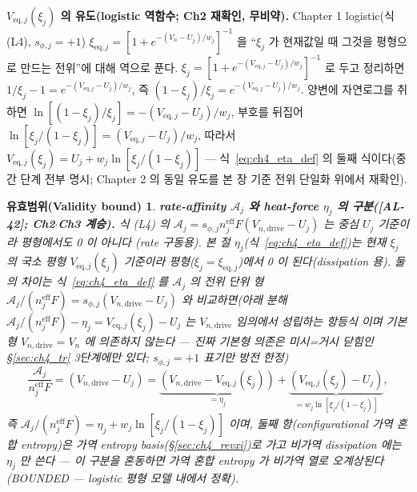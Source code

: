 \documentclass[11pt,a4paper]{article}
\newtheorem*{boundbox}{유효범위(Validity bound)}
\newcommand{\eff}{\mathrm{eff}}
\newcommand{\eq}{\mathrm{eq}}
\newcommand{\drive}{\mathrm{drive}}
\newcommand{\AL}[1]{\textsf{[AL-#1]}}
\begin{document}
\textbf{$V_{\eq,j}(\xi_j)$ 의 유도(logistic 역함수; Ch2 재확인, 무비약).} Chapter 1 logistic(식 (L4),
$s_{\phi,j}=+1$) $\xi_{\eq,j}=[1+e^{-(V_n-U_j)/w_j}]^{-1}$ 을 ``$\xi_j$ 가 현재값일 때 그것을 평형으로 만드는
전위''에 대해 역으로 푼다. $\xi_j=[1+e^{-(V_{\eq,j}-U_j)/w_j}]^{-1}$ 로 두고 정리하면 $1/\xi_j-1=
e^{-(V_{\eq,j}-U_j)/w_j}$, 즉 $(1-\xi_j)/\xi_j=e^{-(V_{\eq,j}-U_j)/w_j}$. 양변에 자연로그를 취하면
$\ln[(1-\xi_j)/\xi_j]=-(V_{\eq,j}-U_j)/w_j$, 부호를 뒤집어 $\ln[\xi_j/(1-\xi_j)]=(V_{\eq,j}-U_j)/w_j$, 따라서
$V_{\eq,j}(\xi_j)=U_j+w_j\ln[\xi_j/(1-\xi_j)]$ — 식~\eqref{eq:ch4_eta_def} 의 둘째 식이다(중간 단계 전부 명시;
Chapter 2 의 동일 유도를 본 장 기준 전위 단일화 위에서 재확인).
\begin{boundbox}
\textbf{rate-affinity $\mathcal A_j$ 와 heat-force $\eta_j$ 의 구분(\AL{42}; Ch2$\cdot$Ch3 계승).} 식 (L4) 의
$\mathcal A_j=s_{\phi,j}n_j^{\eff}F(V_{n,\drive}-U_j)$ 는 \emph{중심} $U_j$ 기준이라 평형에서도 0 이 아니다
(rate 구동용). 본 절 $\eta_j$(식~\eqref{eq:ch4_eta_def})는 \emph{현재} $\xi_j$ 의 국소 평형 $V_{\eq,j}(\xi_j)$
기준이라 평형($\xi_j=\xi_{\eq,j}$)에서 0 이 된다(dissipation 용). 둘의 차이는 식~\eqref{eq:ch4_eta_def} 를
$\mathcal A_j$ 의 전위 단위 형 $\mathcal A_j/(n_j^{\eff}F)=s_{\phi,j}(V_{n,\drive}-U_j)$ 와 비교하면(아래 분해
$\mathcal A_j/(n_j^{\eff}F)-\eta_j=V_{\eq,j}(\xi_j)-U_j$ 는 $V_{n,\drive}$ \emph{임의}에서 성립하는 \emph{항등식}
이며 기본형 $V_{n,\drive}=V_n$ 에 의존하지 않는다 — 진짜 기본형 의존은 미시=거시 닫힘인 \S\ref{sec:ch4_tr}
3단계에만 있다; $s_{\phi,j}=+1$ 표기만 방전 한정)
\[
\frac{\mathcal A_j}{n_j^{\eff}F}=(V_{n,\drive}-U_j)
=\underbrace{(V_{n,\drive}-V_{\eq,j}(\xi_j))}_{=\eta_j}
+\underbrace{(V_{\eq,j}(\xi_j)-U_j)}_{=w_j\ln[\xi_j/(1-\xi_j)]},
\]
즉 $\mathcal A_j/(n_j^{\eff}F)=\eta_j+w_j\ln[\xi_j/(1-\xi_j)]$ 이며, 둘째 항(configurational 가역 혼합 entropy)은
\emph{가역} entropy basis(\S\ref{sec:ch4_revxi})로 가고 \emph{비가역} dissipation 에는 $\eta_j$ 만 쓴다 — 이
구분을 혼동하면 가역 혼합 entropy 가 비가역 열로 오계상된다(BOUNDED — logistic 평형 모델 내에서 정확).
\end{boundbox}

\end{document}
